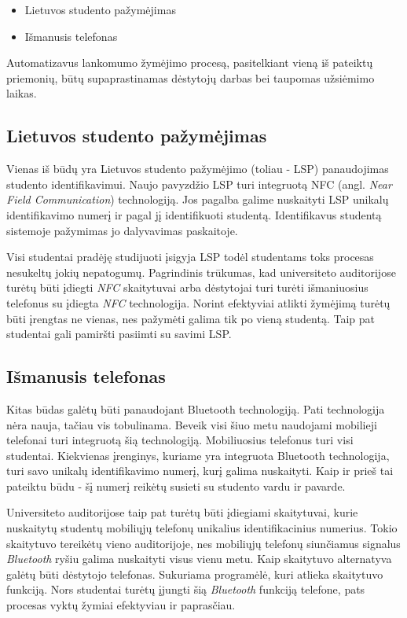 \documentclass{VUMIFPSkursinis}
\begin{document}
\begin{itemize}
	\item Lietuvos studento pažymėjimas
	\item Išmanusis telefonas
\end{itemize}

Automatizavus lankomumo žymėjimo procesą, pasitelkiant vieną iš pateiktų priemonių, būtų supaprastinamas dėstytojų darbas bei taupomas užsiėmimo laikas. 

\subsection{Lietuvos studento pažymėjimas}
Vienas iš būdų yra Lietuvos studento pažymėjimo (toliau - LSP) panaudojimas studento identifikavimui. Naujo pavyzdžio LSP turi integruotą NFC (angl. \textit{Near Field Communication}) technologiją.  Jos pagalba galime nuskaityti LSP unikalų identifikavimo numerį ir pagal jį identifikuoti studentą. Identifikavus studentą sistemoje pažymimas jo dalyvavimas paskaitoje.

Visi studentai pradėję studijuoti įsigyja LSP todėl studentams toks procesas nesukeltų jokių nepatogumų. Pagrindinis trūkumas, kad universiteto auditorijose turėtų būti įdiegti \textit{NFC} skaitytuvai arba dėstytojai turi turėti išmaniuosius telefonus su įdiegta \textit{NFC} technologija. Norint efektyviai atlikti žymėjimą turėtų būti įrengtas ne vienas, nes pažymėti galima tik po vieną studentą. Taip pat studentai gali pamiršti pasiimti su savimi LSP.

\subsection{Išmanusis telefonas}
Kitas būdas galėtų būti panaudojant Bluetooth technologiją. Pati technologija nėra nauja, tačiau vis tobulinama. Beveik visi šiuo metu naudojami mobilieji telefonai turi integruotą šią technologiją. Mobiliuosius telefonus turi visi studentai. Kiekvienas įrenginys, kuriame yra integruota Bluetooth technologija, turi savo unikalų identifikavimo numerį, kurį galima nuskaityti. Kaip ir prieš tai pateiktu būdu - šį numerį reikėtų susieti su studento vardu ir pavarde.

Universiteto auditorijose taip pat turėtų būti įdiegiami skaitytuvai, kurie nuskaitytų studentų mobiliųjų telefonų unikalius identifikacinius numerius. Tokio skaitytuvo tereikėtų vieno auditorijoje, nes mobiliųjų telefonų siunčiamus signalus \textit{Bluetooth} ryšiu galima nuskaityti visus vienu metu. Kaip skaitytuvo alternatyva galėtų būti dėstytojo telefonas. Sukuriama programėlė, kuri atlieka skaitytuvo funkciją. Nors studentai turėtų įjungti šią \textit{Bluetooth} funkciją telefone, pats procesas vyktų žymiai efektyviau ir paprasčiau.
\end{document}
